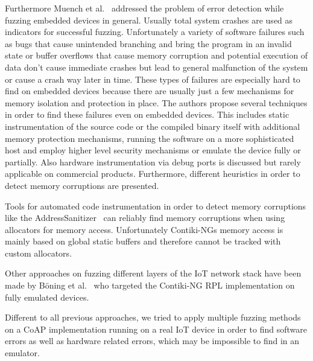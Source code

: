 Furthermore Muench et al.~\cite{EURECOM+5417} addressed the problem of error detection while fuzzing embedded devices in general. Usually total system crashes are used as indicators for successful fuzzing. Unfortunately a variety of software failures such as bugs that cause unintended branching and bring the program in an invalid state or buffer overflows that cause memory corruption and potential execution of data don't cause immediate crashes but lead to general malfunction of the system or cause a crash way later in time. These types of failures are especially hard to find on embedded devices because there are usually just a few mechanisms for memory isolation and protection in place. The authors propose several techniques in order to find these failures even on embedded devices. This includes static instrumentation of the source code or the compiled binary itself with additional memory protection mechanisms, running the software on a more sophisticated host and employ higher level security mechanisms or emulate the device fully or partially. Also hardware instrumentation via debug ports is discussed but rarely applicable on commercial products. Furthermore, different heuristics in order to detect memory corruptions are presented.

Tools for automated code instrumentation in order to detect memory corruptions like the AddressSanitizer~\cite{addressSanitizer} can reliably find memory corruptions when using allocators for memory access. Unfortunately Contiki-NGs memory access is mainly based on global static buffers and therefore cannot be tracked with custom allocators.

Other approaches on fuzzing different layers of the IoT network stack have been made by Böning et al.~\cite{PawelLeo} who targeted the Contiki-NG RPL implementation on fully emulated devices.

Different to all previous approaches, we tried to apply multiple fuzzing methods on a CoAP implementation running on a real IoT device in order to find software errors as well as hardware related errors, which may be impossible to find in an emulator.
